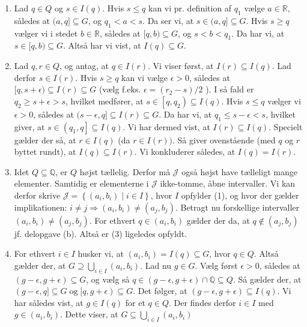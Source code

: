 \documentclass{Class}
\begin{document}
\begin{enumerate}
    \item Lad $q \in Q$ og $s \in I(q)$. Hvis $s \leq q$ kan vi pr. definition af $q_1$ vælge $a \in \mathbb{R}$, således at $(a, q] \subseteq G$, og $q_1<a<s$. Da ser vi, at $s \in(a, q] \subseteq G$. Hvis $s \geq q$ vælger vi i stedet $b \in \mathbb{R}$, således at $[q, b) \subseteq G$, og $s<b<q_1$. Da har vi, at $s \in[q, b) \subseteq G$. Altså har vi vist, at $I(q) \subseteq G$.
    \item Lad $q, r \in Q$, og antag, at $q \in I(r)$. Vi viser først, at $I(r) \subseteq I(q)$. Lad derfor $s \in I(r)$. Hvis $s \geq q$ kan vi vælge $\epsilon>0$, således at $[q, s+\epsilon) \subseteq I(r) \subseteq G$ (vælg f.eks. $\epsilon=\left(r_2-s\right) / 2$ ). I så fald er $q_2 \geq s+\epsilon>s$, hvilket medfører, at $s \in\left[q, q_2\right) \subseteq I(q)$. Hvis $s \leq q$ vælger vi $\epsilon>0$, således at $(s-\epsilon, q] \subseteq I(r) \subseteq G$. Da har vi, at $q_1 \leq s-\epsilon<s$, hvilket giver, at $s \in\left(q_1, q\right] \subseteq I(q)$. Vi har dermed vist, at $I(r) \subseteq I(q)$. Specielt gælder der så, at $r \in I(q)$ (da $r \in I(r))$. Så giver ovenstående (med $q$ og $r$ byttet rundt), at $I(q) \subseteq I(r)$. Vi konkluderer således, at $I(q)=I(r)$.
    \item Idet $Q \subseteq \mathbb{Q}$, er $Q$ højst tællelig. Derfor må $\mathcal{J}$ også højst have tælleligt mange elementer. Samtidig er elementerne i $\mathcal{J}$ ikke-tomme, åbne intervaller. Vi kan derfor skrive $\mathcal{J}=\left\{\left(a_i, b_i\right) \mid i \in I\right\}$, hvor $I$ opfylder (1), og hvor der gælder implikationen: $i \neq j \Longrightarrow\left(a_i, b_i\right) \neq\left(a_j, b_j\right)$. Betragt nu forskellige intervaller $\left(a_i, b_i\right) \neq\left(a_j, b_j\right)$. For ethvert $q \in\left(a_i, b_i\right)$ gælder der da, at $q \notin\left(a_j, b_j\right)$ jf. delopgave (b). Altså er (3) ligeledes opfyldt.
    \item For ethvert $i \in I$ husker vi, at $\left(a_i, b_i\right)=I(q) \subseteq G$, hvor $q \in Q$. Altså gælder der, at $G \supseteq \bigcup_{i \in I}\left(a_i, b_i\right)$. Lad nu $g \in G$. Vælg først $\epsilon>0$, således at $(g-\epsilon, g+\epsilon) \subseteq G$, og vælg så $q \in(g-\epsilon, g+\epsilon) \cap \mathbb{Q} \subseteq Q$. Så gælder der, at $(g-\epsilon, q] \subseteq G \operatorname{og}[q, g+\epsilon) \subseteq G$. Det følger, at $(g-\epsilon, g+\epsilon) \subseteq I(q)$. Vi har således vist, at $g \in I(q)$ for et $q \in Q$. Der findes derfor $i \in I$ med $g \in\left(a_i, b_i\right)$. Dette viser, at $G \subseteq \bigcup_{i \in I}\left(a_i, b_i\right)$
\end{enumerate}
\end{document}
